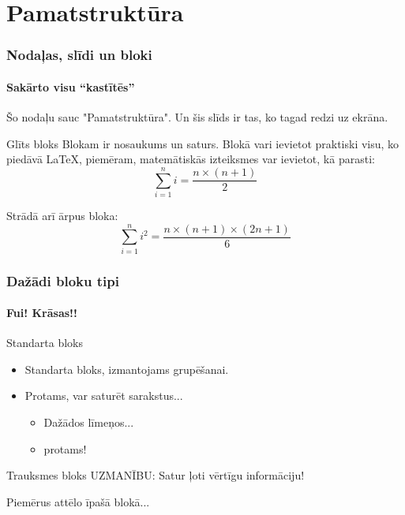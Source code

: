 \documentclass[12pt]{beamer}
\begin{document}
\section{Pamatstruktūra}
\begin{frame}
	\frametitle{Nodaļas, slīdi un bloki}
	\framesubtitle{Sakārto visu ``kastītēs''}

	Šo nodaļu sauc "Pamatstruktūra". Un šis slīds ir tas, ko tagad redzi uz ekrāna.

	\begin{block}{Glīts bloks}
		Blokam ir nosaukums un saturs. Blokā vari ievietot praktiski visu, ko piedāvā LaTeX, piemēram, matemātiskās izteiksmes var ievietot, kā parasti:
		\begin{equation}
			\sum_{i=1}^n i = \frac{n \times (n+1)}{2}
		\end{equation}
	\end{block}

	Strādā arī ārpus bloka:
	\begin{equation}
		\sum_{i=1}^n i^2 = \frac{n \times (n+1) \times (2n+1)}{6}
	\end{equation}
\end{frame}

\begin{frame}
	\frametitle{Dažādi bloku tipi}
	\framesubtitle{Fui! Krāsas!!}
	\begin{block}{Standarta bloks}
		\begin{itemize}
			\item Standarta bloks, izmantojams grupēšanai.
			\item Protams, var saturēt sarakstus...
			\begin{itemize}
				\item Dažādos līmeņos...
				\item protams!
			\end{itemize}
		\end{itemize}
	\end{block}
	\begin{alertblock}{Trauksmes bloks}
		UZMANĪBU: Satur ļoti vērtīgu informāciju!
	\end{alertblock}
	\begin{example}
		Piemērus attēlo īpašā blokā...
	\end{example}
\end{frame}
\end{document}
